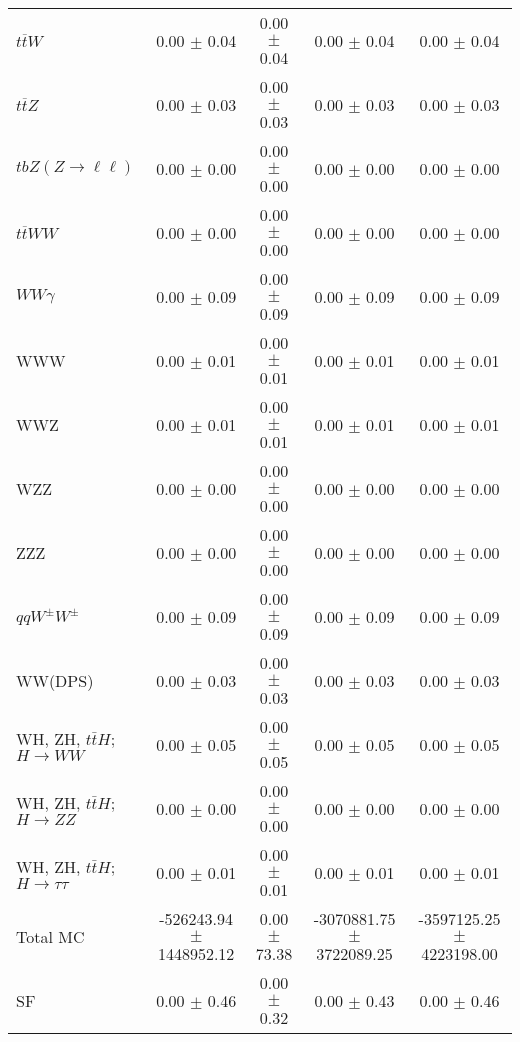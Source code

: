 \begin{tabular}{l|cccc}
                   $t\overline{t}W$ &  0.00 $\pm$  0.04 &  0.00 $\pm$  0.04 &  0.00 $\pm$  0.04 &  0.00 $\pm$  0.04 \\
                   $t\overline{t}Z$ &  0.00 $\pm$  0.03 &  0.00 $\pm$  0.03 &  0.00 $\pm$  0.03 &  0.00 $\pm$  0.03 \\
    $tbZ (Z \rightarrow \ell \ell)$ &  0.00 $\pm$  0.00 &  0.00 $\pm$  0.00 &  0.00 $\pm$  0.00 &  0.00 $\pm$  0.00 \\
                  $t\overline{t}WW$ &  0.00 $\pm$  0.00 &  0.00 $\pm$  0.00 &  0.00 $\pm$  0.00 &  0.00 $\pm$  0.00 \\
                         $WW\gamma$ &  0.00 $\pm$  0.09 &  0.00 $\pm$  0.09 &  0.00 $\pm$  0.09 &  0.00 $\pm$  0.09 \\
                                WWW &  0.00 $\pm$  0.01 &  0.00 $\pm$  0.01 &  0.00 $\pm$  0.01 &  0.00 $\pm$  0.01 \\
                                WWZ &  0.00 $\pm$  0.01 &  0.00 $\pm$  0.01 &  0.00 $\pm$  0.01 &  0.00 $\pm$  0.01 \\
                                WZZ &  0.00 $\pm$  0.00 &  0.00 $\pm$  0.00 &  0.00 $\pm$  0.00 &  0.00 $\pm$  0.00 \\
                                ZZZ &  0.00 $\pm$  0.00 &  0.00 $\pm$  0.00 &  0.00 $\pm$  0.00 &  0.00 $\pm$  0.00 \\
                 $qqW^{\pm}W^{\pm}$ &  0.00 $\pm$  0.09 &  0.00 $\pm$  0.09 &  0.00 $\pm$  0.09 &  0.00 $\pm$  0.09 \\
                            WW(DPS) &  0.00 $\pm$  0.03 &  0.00 $\pm$  0.03 &  0.00 $\pm$  0.03 &  0.00 $\pm$  0.03 \\
WH, ZH, $t\bar{t}H$; $H \rightarrow WW$ &  0.00 $\pm$  0.05 &  0.00 $\pm$  0.05 &  0.00 $\pm$  0.05 &  0.00 $\pm$  0.05 \\
WH, ZH, $t\bar{t}H$; $H \rightarrow ZZ$ &  0.00 $\pm$  0.00 &  0.00 $\pm$  0.00 &  0.00 $\pm$  0.00 &  0.00 $\pm$  0.00 \\
WH, ZH, $t\bar{t}H$; $H \rightarrow \tau\tau$ &  0.00 $\pm$  0.01 &  0.00 $\pm$  0.01 &  0.00 $\pm$  0.01 &  0.00 $\pm$  0.01 \\
\hline\hline
                           Total MC & -526243.94 $\pm$ 1448952.12 &  0.00 $\pm$ 73.38 & -3070881.75 $\pm$ 3722089.25 & -3597125.25 $\pm$ 4223198.00 \\
\hline
                                 SF &  0.00 $\pm$  0.46 &  0.00 $\pm$  0.32 &  0.00 $\pm$  0.43 &  0.00 $\pm$  0.46 \\

\end{tabular}
